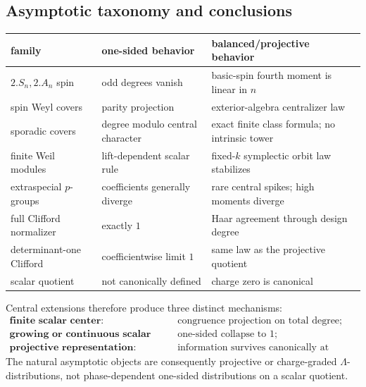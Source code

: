 \documentclass[10pt]{article}
\begin{document}
\subsection{Asymptotic taxonomy and conclusions}

\begin{center}
\small
\begin{tabularx}{\linewidth}{@{}l X X@{}}
\toprule
family & one-sided behavior & balanced/projective behavior\\
\midrule
$2.S_n,2.A_n$ spin & odd degrees vanish & basic-spin fourth moment is linear in $n$\\
spin Weyl covers & parity projection & exterior-algebra centralizer law\\
sporadic covers & degree modulo central character & exact finite class formula; no intrinsic tower\\
finite Weil modules & lift-dependent scalar rule & fixed-$k$ symplectic orbit law stabilizes\\
extraspecial $p$-groups & coefficients generally diverge & rare central spikes; high moments diverge\\
full Clifford normalizer & exactly $1$ & Haar agreement through design degree\\
determinant-one Clifford & coefficientwise limit $1$ & same law as the projective quotient\\
scalar quotient & not canonically defined & charge zero is canonical\\
\bottomrule
\end{tabularx}
\end{center}

Central extensions therefore produce three distinct mechanisms:
\[
\boxed{
\begin{array}{ll}
\textbf{finite scalar center:}&\text{congruence projection on total degree};\\[1mm]
\textbf{growing or continuous scalar center:}&\text{one-sided collapse to }1;\\[1mm]
\textbf{projective representation:}&\text{information survives canonically at charge zero.}
\end{array}}
\]
The natural asymptotic objects are consequently projective or charge-graded
$\Lambda$-distributions, not phase-dependent one-sided distributions on a
scalar quotient.

\clearpage
\end{document}

